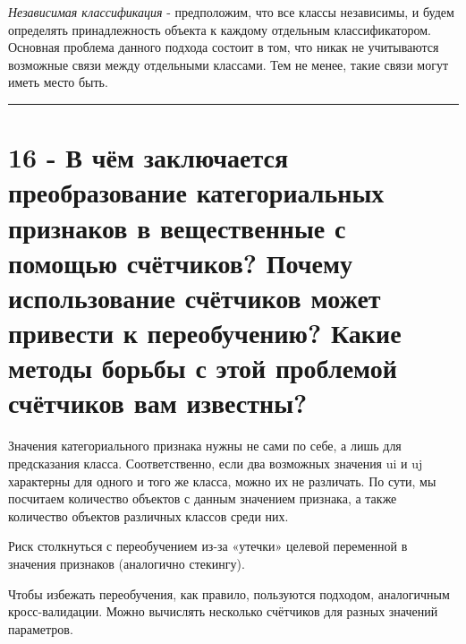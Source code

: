 \documentclass[11pt]{article}
\begin{document}
\emph{Независимая классификация} - предположим, что все классы
независимы, и будем определять принадлежность объекта к каждому
отдельным классификатором. Основная проблема данного подхода состоит в
том, что никак не учитываются возможные связи между отдельными классами.
Тем не менее, такие связи могут иметь место быть.

    \begin{center}\rule{0.5\linewidth}{\linethickness}\end{center}

    \section{16 - В чём заключается преобразование категориальных признаков
в вещественные с помощью счётчиков? Почему использование счётчиков может
привести к переобучению? Какие методы борьбы с этой проблемой счётчиков
вам
известны?}\label{ux432-ux447ux451ux43c-ux437ux430ux43aux43bux44eux447ux430ux435ux442ux441ux44f-ux43fux440ux435ux43eux431ux440ux430ux437ux43eux432ux430ux43dux438ux435-ux43aux430ux442ux435ux433ux43eux440ux438ux430ux43bux44cux43dux44bux445-ux43fux440ux438ux437ux43dux430ux43aux43eux432-ux432-ux432ux435ux449ux435ux441ux442ux432ux435ux43dux43dux44bux435-ux441-ux43fux43eux43cux43eux449ux44cux44e-ux441ux447ux451ux442ux447ux438ux43aux43eux432-ux43fux43eux447ux435ux43cux443-ux438ux441ux43fux43eux43bux44cux437ux43eux432ux430ux43dux438ux435-ux441ux447ux451ux442ux447ux438ux43aux43eux432-ux43cux43eux436ux435ux442-ux43fux440ux438ux432ux435ux441ux442ux438-ux43a-ux43fux435ux440ux435ux43eux431ux443ux447ux435ux43dux438ux44e-ux43aux430ux43aux438ux435-ux43cux435ux442ux43eux434ux44b-ux431ux43eux440ux44cux431ux44b-ux441-ux44dux442ux43eux439-ux43fux440ux43eux431ux43bux435ux43cux43eux439-ux441ux447ux451ux442ux447ux438ux43aux43eux432-ux432ux430ux43c-ux438ux437ux432ux435ux441ux442ux43dux44b}

Значения категориального признака нужны не сами по себе, а лишь для
предсказания класса. Соответственно, если два возможных значения ui и uj
характерны для одного и того же класса, можно их не различать. По сути,
мы посчитаем количество объектов с данным значением признака, а также
количество объектов различных классов среди них.

Риск столкнуться с переобучением из-за «утечки» целевой переменной в
значения признаков (аналогично стекингу).

Чтобы избежать переобучения, как правило, пользуются подходом,
аналогичным кросс-валидации. Можно вычислять несколько счётчиков для
разных значений параметров.
\end{document}
